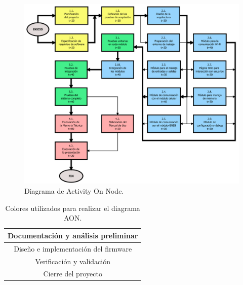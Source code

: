 \documentclass[
11pt, %
]{charter}
\begin{document}
\begin{figure}[htpb]
\centering 
\includegraphics[width=1.1\textwidth]{./Figuras/aon_critico.pdf}
\caption{Diagrama de Activity On Node.}
\label{fig:aon}
\end{figure} 

\begin{table}[ht]
\centering
\begin{tabular}{|c|}
\hline
\rowcolor[HTML]{FBFB7B}
Documentación y análisis preliminar		\\ \hline
\rowcolor[HTML]{A9D3FA}
Diseño e implementación del firmware	\\ \hline
\rowcolor[HTML]{90EE90}
Verificación y validación				\\ \hline
\rowcolor[HTML]{FEABAB}
Cierre del proyecto						\\ \hline
\end{tabular}
\caption{Colores utilizados para realizar el diagrama AON.}
\label{tab:aonColors}
\end{table}

\end{document}
